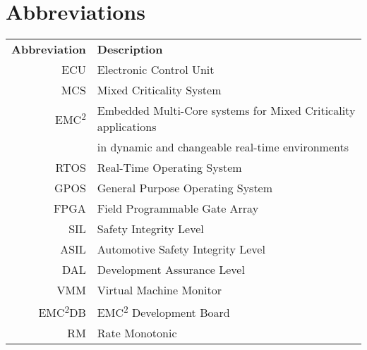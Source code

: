 \chapter*{Abbreviations}
\begin{tabular}{r l}
\textbf{Abbreviation} 	& \textbf{Description} \vspace{.5em} \\
ECU		&Electronic Control Unit\\
MCS		&Mixed Criticality System\\
EMC\textsuperscript{2}	&Embedded Multi-Core systems for Mixed Criticality applications\\
 		&in dynamic and changeable real-time environments\\
RTOS	&Real-Time Operating System\\
GPOS	&General Purpose Operating System\\
FPGA	&Field Programmable Gate Array\\
SIL		&Safety Integrity Level\\
ASIL	&Automotive Safety Integrity Level\\
DAL		&Development Assurance Level\\
VMM		&Virtual Machine Monitor\\
EMC\textsuperscript{2}DB	&EMC\textsuperscript{2} Development Board\\
RM		&Rate Monotonic\\

\end{tabular}